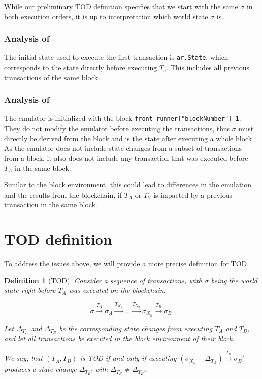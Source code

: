\documentclass[draft,final]{vutinfth} %
\newtheorem{definition}{Definition}
\begin{document}
While our preliminary TOD definition specifies that we start with the same $\sigma$ in both execution orders, it is up to interpretation which world state $\sigma$ is.

\subsubsection{Analysis of \cite{zhang_combatting_2023}}

The initial state used to execute the first transaction is \verb|ar.State|, which corresponds to the state directly before executing $T_a$. This includes all previous transactions of the same block.

\subsubsection{Analysis of \cite{torres_frontrunner_2021}}

The emulator is initialized with the block \verb|front_runner["blockNumber"]-1|. They do not modify the emulator before executing the transactions, thus $\sigma$ must directly be derived from the block and is the state after executing a whole block. As the emulator does not include state changes from a subset of transactions from a block, it also does not include any transaction that was executed before $T_A$ in the same block.

Similar to the block environment, this could lead to differences in the emulation and the results from the blockchain, if $T_A$ or $T_V$ is impacted by a previous transaction in the same block.

\section{TOD definition}

To address the issues above, we will provide a more precise definition for TOD.

\begin{definition}[TOD]
    Consider a sequence of transactions, with $\sigma$ being the world state right before $T_A$ was executed on the blockchain:

    $$\sigma \xrightarrow{T_A} \sigma_A \xrightarrow{T_{X_1}} \dots \xrightarrow{T_{X_n}} \sigma_{X_n} \xrightarrow{T_B} \sigma_B$$

    Let $\Delta_{T_A}$ and $\Delta_{T_B}$ be the corresponding state changes from executing $T_A$ and $T_B$, and let all transactions be executed in the block environment of their block.

    We say, that $(T_A, T_B)$ is TOD if and only if executing $(\sigma_{X_n} - \Delta_{T_A}) \xrightarrow{T_B} \sigma_B\prime$ produces a state change $\Delta_{T_B\prime}$ with $\Delta_{T_B} \neq \Delta_{T_B\prime}$.
\end{definition}
\end{document}
